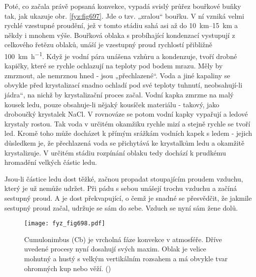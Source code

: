     Poté, co začala právě popsaná konvekce, vypadá svislý průřez bouřkové buňky tak, jak ukazuje
    obr. \ref{fyz:fig697}. Jde o tzv. „zralou“ bouřku. V ní vzniká velmi rychlé vzestupné
    proudění, jež v tomto stádiu sahá asi až do \SIrange{10}{15}{\km} a někdy i mnohem výše.
    Bouřková oblaka s probíhající kondenzací vystupují z celkového řetězu oblaků, unáší je
    vzestupný proud rychlostí přibližně \SI{100}{\km\per\hour}. Když je vodní pára unášena vzhůru
    a kondenzuje, tvoří drobné kapičky, které se rychle ochlazují na teploty pod bodem mrazu. Měly
    by zmrznout, ale nemrznou hned - jsou „přechlazené“. Voda a jiné kapaliny se obvykle před
    krystalizací snadno ochladí pod své teploty tuhnutí, neobsahují-li jádra“, na nichž by
    krystalizační proces začal. Vodní kapka zmrzne na malý kousek ledu, pouze obsahuje-li nějaký
    kousíček materiálu - takový, jako droboučký krystalek NaCl. V rovnováze se potom vodní kapky
    vypařují a ledové krystaly rostou. Tak voda v určitém okamžiku rychle mizí a stejně rychle se
    tvoří led. Kromě toho může docházet k přímým srážkám vodních kapek s ledem - jejich důsledkem
    je, že přechlazená voda se přichytává ke krystalkům ledu a okamžitě krystalizuje. V určitém
    stádiu rozpínání oblaku tedy dochází k prudkému hromadění velkých částic ledu.

    Jsou-li částice ledu dost těžké, začnou propadat stoupajícím proudem vzduchu, který je už
    nemůže udržet. Při pádu s sebou unášejí trochu vzduchu a začíná sestupný proud. A je dost
    překvapující, o čemž je snadné se přesvědčit, že jakmile sestupný proud začal, udržuje se sám
    do sebe. Vzduch se nyní sám žene dolů.

    \begin{figure}[ht!] %
      \centering
      \texttt{[image: fyz\_fig698.pdf]}
      \caption{Cumulonimbus (Cb) je vrcholná fáze konvekce v atmosféře. Dříve uvedené procesy nyní
              dosahují svých maxim. Oblak je velice mohutný a hustý s velkým vertikálním rozsahem
              a má obvykle tvar ohromných kup nebo věží. (\cite[s.~707]{Feynman02})}
      \label{fyz:fig698}
    \end{figure}

